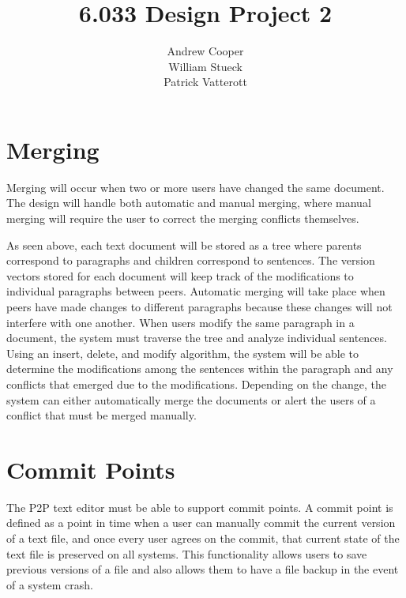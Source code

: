 \documentclass{6033dp1/6033dp1}
\title{6.033 Design Project 2}
\author{Andrew Cooper\\ William Stueck\\ Patrick Vatterott}
\begin{document}
\maketitle








\section{Merging}
Merging will occur when two or more users have changed the same document. The design will handle both automatic and manual merging, where manual merging will require the user to correct the merging conflicts themselves.

As seen above, each text document will be stored as a tree where parents correspond to paragraphs and children correspond to sentences. The version vectors stored for each document will keep track of the modifications to individual paragraphs between peers. Automatic merging will take place when peers have made changes to different paragraphs because these changes will not interfere with one another. When users modify the same paragraph in a document, the system must traverse the tree and analyze individual sentences. Using an insert, delete, and modify algorithm, the system will be able to determine the modifications among the sentences within the paragraph and any conflicts that emerged due to the modifications. Depending on the change, the system can either automatically merge the documents or alert the users of a conflict that must be merged manually.

\section{Commit Points}
The P2P text editor must be able to support commit points. A commit point is defined as a point in time when a user can manually commit the current version of a text file, and once every user agrees on the commit, that current state of the text file is preserved on all systems.  This functionality allows users to save previous versions of a file and also allows them to have a file backup in the event of a system crash.
\end{document}
